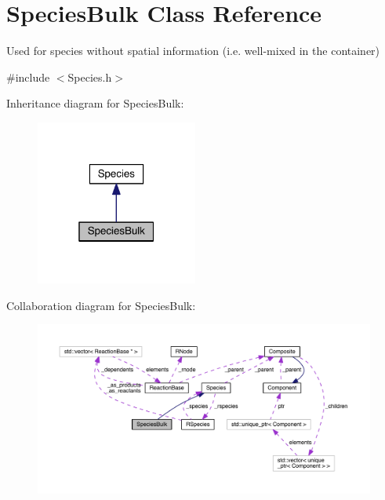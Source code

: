 \hypertarget{classSpeciesBulk}{\section{Species\+Bulk Class Reference}
\label{classSpeciesBulk}
}


Used for species without spatial information (i.\+e. well-\/mixed in the container)  




{\ttfamily \#include $<$Species.\+h$>$}



Inheritance diagram for Species\+Bulk\+:\nopagebreak
\begin{figure}[H]
\begin{center}
\leavevmode
\includegraphics[width=151pt]{classSpeciesBulk__inherit__graph}
\end{center}
\end{figure}


Collaboration diagram for Species\+Bulk\+:\nopagebreak
\begin{figure}[H]
\begin{center}
\leavevmode
\includegraphics[width=350pt]{classSpeciesBulk__coll__graph}
\end{center}
\end{figure}
